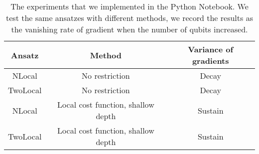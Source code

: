 \begin{table}
    \centering
    \begin{tabular}{|| c c c ||}
        \hline
        Ansatz   & Method                             & Variance of gradients \\[0.5ex]
        \hline \hline
        NLocal   & No restriction                     & Decay                 \\
        \hline
        TwoLocal & No restriction                     & Decay                 \\
        \hline
        NLocal   & Local cost function, shallow depth & Sustain               \\
        \hline
        TwoLocal & Local cost function, shallow depth & Sustain               \\
        \hline
    \end{tabular}
    \caption{
        The experiments that we implemented in the Python Notebook. We test the same ansatzes with different methods, we record the results as the vanishing rate of gradient when the number of qubits increased.
    }
    \label{Experiment summary table}
\end{table}












